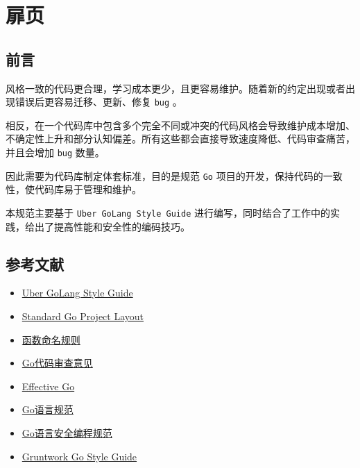 \chapter{扉页}

\section{前言}
风格一致的代码更合理，学习成本更少，且更容易维护。随着新的约定出现或者出现错误后更容易迁移、更新、修复 \texttt{bug} 。

相反，在一个代码库中包含多个完全不同或冲突的代码风格会导致维护成本增加、不确定性上升和部分认知偏差。所有这些都会直接导致速度降低、代码审查痛苦，并且会增加 \texttt{bug} 数量。

因此需要为代码库制定体套标准，目的是规范 \texttt{Go} 项目的开发，保持代码的一致性，使代码库易于管理和维护。

本规范主要基于 \texttt{Uber GoLang Style Guide} 进行编写，同时结合了工作中的实践，给出了提高性能和安全性的编码技巧。

\section{参考文献}
\begin{itemize}[leftmargin=4em]
  \item \href{https://github.com/uber-go/guide/blob/master/style.md}{Uber GoLang Style Guide}
  \item \href{https://github.com/golang-standards/project-layout}{Standard Go Project Layout}
  \item \href{https://golang.org/doc/effective\_go#mixed-caps}{函数命名规则}
  \item \href{https://github.com/golang/go/wiki/CodeReviewComments}{Go代码审查意见}
  \item \href{https://golang.org/doc/effective\_go}{Effective Go}
  \item \href{https://golang.org/ref/spec}{Go语言规范}
  \item \href{https://yougg.github.io/2017/06/12/go\%E8\%AF\%AD\%E8\%A8\%80\%E5\%AE\%89\%E5\%85\%A8\%E7\%BC\%96\%E7\%A8\%8B\%E8\%A7\%84\%E8\%8C\%83/}{Go语言安全编程规范}
  \item \href{https://gruntwork.io/guides/style\%20guides/golang-style-guide}{Gruntwork Go Style Guide}
\end{itemize}
